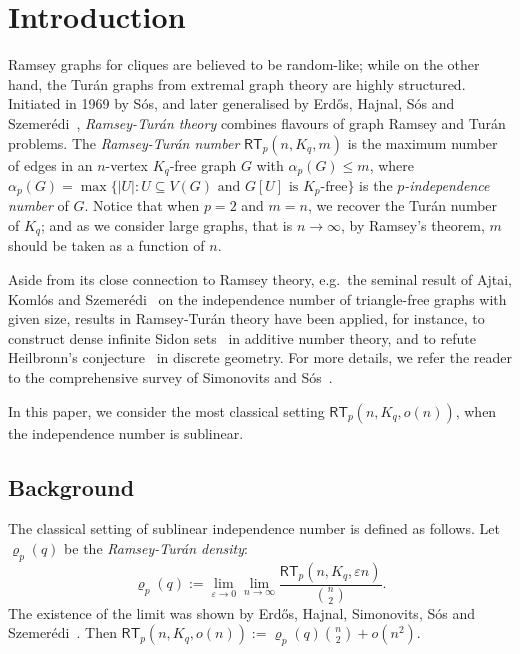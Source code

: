 \documentclass[11pt, a4paper]{article}
\theoremstyle{definition}
\def\al{{\alpha}}
\def\eps{{\varepsilon}}
\newcommand{\rt}{{\mathsf{RT}}}
\begin{document}




\section{Introduction}
Ramsey graphs for cliques are believed to be random-like; while on the other hand, the Tur\'an graphs from extremal graph theory are highly structured. Initiated in 1969 by S\'os, and later generalised by Erd\H{o}s, Hajnal, S\'os and Szemer\'edi~\cite{EHSSz}, \emph{Ramsey-Tur\'an theory} combines flavours of graph Ramsey and Tur\'an problems. The \emph{Ramsey-Tur\'an number} $\rt_p(n,K_q,m)$ is the maximum number of edges in an $n$-vertex $K_q$-free graph $G$ with $\alpha_p(G)\le m$, where $\al_p(G)=\max\{|U|:U\subseteq V(G)\text{ and }G[U]\text{ is }K_p\text{-free}\}$ is the \emph{$p$-independence number} of $G$. Notice that when $p=2$ and $m=n$, we recover the Tur\'an number of $K_q$; and as we consider large graphs, that is $n\rightarrow\infty$, by Ramsey's theorem, $m$ should be taken as a function of $n$.


 

 Aside from its close connection to Ramsey theory, e.g.~the seminal result of Ajtai, Koml\'os and Szemer\'edi~\cite{AKSz} on the independence number of triangle-free graphs with given size, results in Ramsey-Tur\'an theory have been applied, for instance, to construct dense infinite Sidon sets~\cite{AKSz-Sidon} in additive number theory, and to refute Heilbronn's conjecture~\cite{KPSz} in discrete geometry. For more details, we refer the reader to the comprehensive survey of Simonovits and S\'os~\cite{SimSos}.

In this paper, we consider the most classical setting $\rt_p(n,K_q,o(n))$, when the independence number is sublinear. 


\subsection{Background}
The classical setting of sublinear independence number is defined as follows. Let $\varrho_p(q)$ be the \emph{Ramsey-Tur\'an density}: 
$$
\varrho_p(q) := \lim_{\eps\rightarrow 0}\lim_{n\rightarrow \infty}\frac{\rt_p(n,K_q,\eps n)}{\binom{n}{2}}.
$$
The existence of the limit was shown by Erd\H{o}s, Hajnal, Simonovits, S\'os and Szemer\'edi~\cite{EHSSSz}. Then $\rt_p(n,K_q,o(n)):=\varrho_p(q){n\choose 2}+o(n^2)$.
\end{document}
